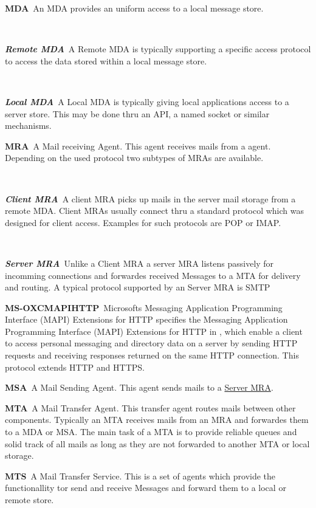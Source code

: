 \documentclass[a4paper,appendixprefix,pdfusetitle,twocolumn,draft,8pt]{scrbook}
\newenvironment{entry}{\par\leavevmode\hangpara{1.5mm}{1}\ignorespaces}{\RaggedRight\par}
\newcommand*{\mainentry}[2]{{\bfseries{#1\label{def:#1}}}~#2\par}
\newcommand*{\subentry}[2]{\par~\begin{minipage}{\columnwidth-0.6cm}{\bfseries{\itshape{#1\label{def:#1}}}}~#2\end{minipage}}
\newcommand*{\defref}[1]{\hyperref[def:#1]{#1}}
\begin{document}
\begin{entry}
  \mainentry{MDA}{An MDA provides an uniform access to a local message store.}
  \subentry{Remote MDA}{A Remote MDA is typically supporting a specific access protocol to access the data stored within a local message store.}
  \subentry{Local MDA}{A Local MDA is typically giving local applications access to a server store. This may be done thru an API, a named socket or similar mechanisms.}
\end{entry}

\begin{entry}
  \mainentry{MRA}{A Mail receiving Agent. This agent receives mails from a agent. Depending on the used protocol two subtypes of MRAs are available.}
  \subentry{Client MRA}{A client MRA picks up mails in the server mail storage from a remote MDA. Client MRAs usually connect thru a standard protocol which was designed for client access. Examples for such protocols are POP or IMAP.}
  \subentry{Server MRA}{Unlike a Client MRA a server MRA listens passively for incomming connections and forwardes received Messages to a MTA for delivery and routing. A typical protocol supported by an Server MRA is SMTP}
\end{entry}

\begin{entry}
  \mainentry{MS-OXCMAPIHTTP}{Microsofts Messaging Application Programming Interface (MAPI) 
  	Extensions for HTTP specifies the Messaging Application Programming Interface (MAPI) Extensions for HTTP in \cite{ms-oxcmapihttp}, which enable a client to access personal messaging and directory data on a server by sending HTTP requests and receiving responses returned on the same HTTP connection. This protocol extends HTTP and HTTPS.}
\end{entry}

\begin{entry}
  \mainentry{MSA}{A Mail Sending Agent. This agent sends mails to a \defref{Server MRA}. }
\end{entry}

\begin{entry}
  \mainentry{MTA}{A Mail Transfer Agent. This transfer agent routes mails between other components. Typically  an MTA receives mails from an MRA and forwardes them to a MDA or MSA. The main task of a MTA is to provide reliable queues and solid track of all mails as long as they are not forwarded to another MTA or local storage.}
\end{entry}

\begin{entry}
  \mainentry{MTS}{A Mail Transfer Service. This is a set of agents which provide the functionallity tor send and receive Messages and forward them to a local or remote store.}
\end{entry}
\end{document}
